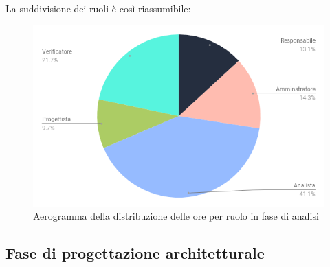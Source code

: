         \pagebreak

        La suddivisione dei ruoli è così riassumibile:
        \begin{figure}[H]
            \centering
            \includegraphics[scale=0.6]{immagini/analisi_pie.png}
            \caption{Aerogramma della distribuzione delle ore per ruolo in fase di analisi}
        \end{figure}

    \subsection{Fase di progettazione architetturale}
